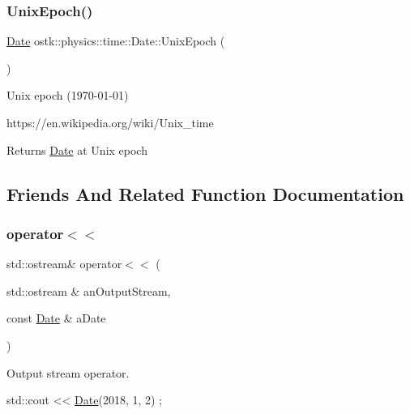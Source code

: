 \subsubsection{\texorpdfstring{Unix\+Epoch()}{UnixEpoch()}}
{\footnotesize\ttfamily \hyperlink{classostk_1_1physics_1_1time_1_1_date}{Date} ostk\+::physics\+::time\+::\+Date\+::\+Unix\+Epoch (\begin{DoxyParamCaption}{ }\end{DoxyParamCaption})\hspace{0.3cm}{\ttfamily [static]}}



Unix epoch (1970-\/01-\/01) 

https\+://en.wikipedia.\+org/wiki/\+Unix\+\_\+time

\begin{DoxyReturn}{Returns}
\hyperlink{classostk_1_1physics_1_1time_1_1_date}{Date} at Unix epoch 
\end{DoxyReturn}


\subsection{Friends And Related Function Documentation}
\mbox{\label{classostk_1_1physics_1_1time_1_1_date_a70ae98f5f6c575ec0c9bd948d12dea41}} 
\subsubsection{\texorpdfstring{operator$<$$<$}{operator<<}}
{\footnotesize\ttfamily std\+::ostream\& operator$<$$<$ (\begin{DoxyParamCaption}\item[{std\+::ostream \&}]{an\+Output\+Stream,  }\item[{const \hyperlink{classostk_1_1physics_1_1time_1_1_date}{Date} \&}]{a\+Date }\end{DoxyParamCaption})\hspace{0.3cm}{\ttfamily [friend]}}



Output stream operator. 


\begin{DoxyCode}
std::cout << \hyperlink{classostk_1_1physics_1_1time_1_1_date_a3ff43a5f7a8ce8350e894b51befeb50d}{Date}(2018, 1, 2) ;
\end{DoxyCode}




